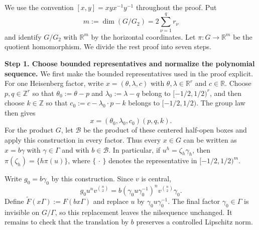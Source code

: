 \documentclass[twoside]{aomart}
\makeatletter
\theoremstyle{paperplain}
\theoremstyle{paperdefinition}
\renewenvironment{proof}[1][\proofname]{\par\pushQED{\qed}%
  \normalfont\topsep6\p@\@plus3\p@\relax\trivlist
  \item[\hskip\labelsep\itshape #1\@addpunct{.}]\ignorespaces
}{\popQED\endtrivlist\@endpefalse}
\numberwithin{equation}{section}
\makeatother
\begin{document}
\begin{proof}
We use the convention $[x,y]=xyx^{-1}y^{-1}$ throughout the proof.
Put $$m:=\dim(G/G_2)=2\sum_{\nu=1}^{q}r_\nu$$ and identify
$G/G_2$ with $\mathbb R^m$ by the horizontal coordinates. Let
$\pi:G\to\mathbb R^m$ be the quotient homomorphism. We divide the rest proof into seven steps.

\par
\medskip
\noindent\textbf{Step 1. Choose bounded representatives and normalize the polynomial sequence.}
We first make the bounded representatives used in the proof explicit.
For one Heisenberg factor, write $x=(\theta,\lambda,c)$ with
$\theta,\lambda\in\mathbb R^r$ and $c\in\mathbb R$. Choose
$p,q\in\mathbb Z^r$ so that
$\theta_0:=\theta-p$ and $\lambda_0:=\lambda-q$ belong to
$[-1/2,1/2)^r$, and then choose $k\in\mathbb Z$ so that
$c_0:=c-\lambda_0\cdot p-k$ belongs to $[-1/2,1/2)$. The group law
then gives
\begin{equation*}
 x=(\theta_0,\lambda_0,c_0)(p,q,k).
\end{equation*}
For the product $G$, let $\mathcal B$ be the product of these centered half-open boxes and apply this construction in every factor. Thus
every $x\in G$ can be written as $x=b\gamma$ with $\gamma\in\Gamma$
and with $b\in\mathcal B$. In particular, if $u^h=\zeta_h\gamma_h$, then
$\pi(\zeta_h)=\{h\pi(u)\}$, where $\{\,\cdot\,\}$ denotes the
representative in $[-1/2,1/2)^m$.

Write $g_0=b\gamma_0$ by this construction. Since $v$ is central,
\begin{equation}
 g_0u^nv^{\binom n2}
 =b(\gamma_0u\gamma_0^{-1})^nv^{\binom n2}\gamma_0.
\label{inv:constant-normalization}
\end{equation}
Define $\widetilde F(x\Gamma):=F(bx\Gamma)$ and replace $u$ by
$\gamma_0u\gamma_0^{-1}$. The final factor $\gamma_0\in\Gamma$ is
invisible on $G/\Gamma$, so this replacement leaves the nilsequence
unchanged. It remains to check that the translation by $b$ preserves a
controlled Lipschitz norm.


\end{proof}
\end{document}
